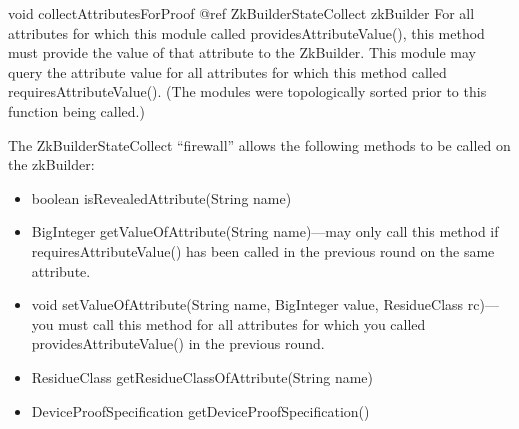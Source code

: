     \begin{method}
    {void}
    {collectAttributesForProof}
    {
      {@ref ZkBuilderStateCollect zkBuilder}
    }
    For all attributes for which this module called providesAttributeValue(), this method
    must provide the value of that attribute to the ZkBuilder. This module may query the attribute
    value for all attributes for which this method called requiresAttributeValue().
    (The modules were topologically sorted prior to this function being called.)

    The ZkBuilderStateCollect ``firewall'' allows the following methods to be called on the zkBuilder:
      \begin{itemize}
      \item boolean isRevealedAttribute(String name)
      \item BigInteger getValueOfAttribute(String name)---may only call this method if requiresAttributeValue() has been
       called in the previous round on the same attribute.
      \item void setValueOfAttribute(String name, BigInteger value, ResidueClass rc)---you must call this method for all attributes
        for which you called providesAttributeValue() in the previous round.
      \item ResidueClass getResidueClassOfAttribute(String name)
      \item DeviceProofSpecification getDeviceProofSpecification()
      \end{itemize}
    \end{method}
